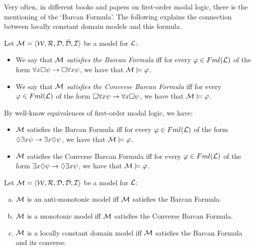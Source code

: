 \qquad Very often, in different books and papers on first-order modal logic, there is the mentioning of the `Barcan Formula'. The following explains the connection between locally constant domain models and this formula.  

\begin{defn}
Let $\mathcal{M} = \langle\mathcal{W},\mathcal{R}, \mathcal{D}, \bar{\mathcal{D}},\mathcal{I}\rangle$ be a model for $\mathcal{L}$:

\begin{itemize} 
\item We say that \textit{$\mathcal{M}$ satisfies the Barcan Formula} iff for every $\varphi \in Fml(\mathcal{L})$ of the form $\forall x \Box \psi \rightarrow \Box \forall x\psi$, we have that $\mathcal{M} \models \varphi$.
\item We say that \textit{$\mathcal{M}$ satisfies the Converse Barcan Formula} iff for every $\varphi \in Fml(\mathcal{L})$ of the form $\Box \forall x\psi \rightarrow \forall x \Box \psi$, we have that $\mathcal{M} \models \varphi$.
\end{itemize}
\end{defn}

\qquad By well-know equivalences of first-order modal logic, we have: 

\begin{itemize} 
\item[] $\mathcal{M}$ satisfies the Barcan Formula iff for every $\varphi \in Fml(\mathcal{L})$ of the form $\Diamond \exists x\psi \rightarrow \exists x \Diamond \psi$, we have that $\mathcal{M} \models \varphi$.
\item[] $\mathcal{M}$ satisfies the Converse Barcan Formula iff for every $\varphi \in Fml(\mathcal{L})$ of the form $\exists x \Diamond \psi \rightarrow \Diamond \exists x\psi$, we have that $\mathcal{M} \models \varphi$.
\end{itemize}

\begin{pro}
Let $\mathcal{M} = \langle\mathcal{W},\mathcal{R}, \mathcal{D}, \bar{\mathcal{D}},\mathcal{I}\rangle$ be a model for $\mathcal{L}$:
\begin{enumerate}[(a)]
\item $\mathcal{M}$ is an anti-monotonic model iff $\mathcal{M}$ satisfies the Barcan Formula.
\item $\mathcal{M}$ is a monotonic model iff $\mathcal{M}$ satisfies the Converse Barcan Formula.
\item $\mathcal{M}$ is a locally constant domain model iff $\mathcal{M}$  satisfies the Barcan Formula and its converse.
\end{enumerate}
\end{pro}

